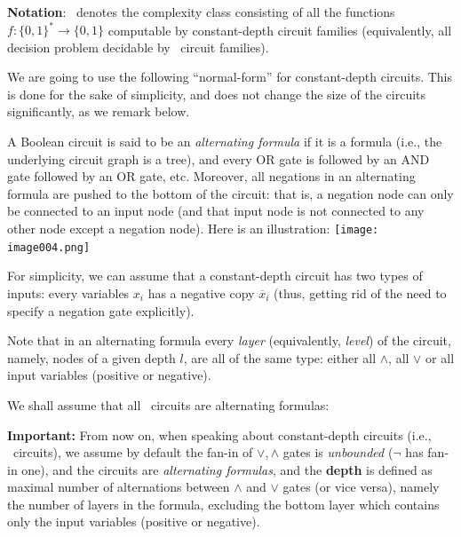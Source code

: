 \textbf{Notation}: \ACZ\ denotes the complexity class 
consisting of all the functions $f:\{0,1\}^* \rightarrow\{0,1\}$ computable by  constant-depth circuit families  (equivalently, all decision problem decidable by \ACZ\ circuit families).



We are going to use the following ``normal-form'' for constant-depth circuits. This is done for the sake of simplicity, and does not change the size of the circuits significantly, as we remark below.


A Boolean circuit is said to be an \emph{alternating  formula} if it is a formula (i.e., the underlying circuit graph is a tree), and every OR gate is followed by an AND gate followed by an OR gate, etc. Moreover, all negations in an alternating formula are pushed to the bottom of the circuit: that is, a negation node can only be connected to an input node (and that input node is not connected to any other node except a negation node). 
Here is an illustration:
\texttt{[image: image004.png]}



For simplicity, we can assume that a constant-depth circuit has two types of inputs: every variables $x_i$ has a negative copy $\overline x_i$ (thus, getting rid of the need to specify a negation gate explicitly).  

Note that in an alternating formula every \emph{layer} (equivalently, \emph{level}) of the circuit, namely, nodes of a given depth $l$, are all of the same type: either all $\land$, all $\lor$ or all input variables (positive or negative).



We shall assume that all \ACZ\ circuits are alternating formulas:


\begin{tcolorbox}[colframe=white, colback=gray!11, boxrule=0mm, sharp corners]
 \textbf{Important:} From now on, when speaking about constant-depth circuits (i.e., \ACZ\ circuits), we assume by default the fan-in of $\lor, \land$ gates  is \emph{unbounded} ($\neg$ has fan-in one), and the circuits are \emph{alternating formulas}, and the \textbf{depth} is defined as maximal number of alternations between $\land$ and $\lor$ gates (or vice versa), namely the number of layers in the formula,  excluding the bottom layer which contains only the input variables (positive or negative).  
\end{tcolorbox}

